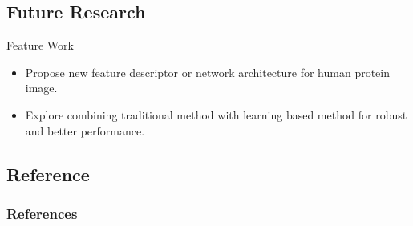 \documentclass[unknownkeysallowed]{beamer}
\begin{document}
	\subsection{Future Research}
	\begin{frame}
		\begin{block}{Feature Work}
		\begin{itemize}
			\item Propose new feature descriptor or network architecture for human protein image.
			\item Explore combining traditional method with learning based method for robust and better performance.
		\end{itemize}	
		\end{block}
	\end{frame}
	
	\subsection{Reference}
	\begin{frame}[allowframebreaks]
        \frametitle{References}
        
        
		
	\end{frame}
\end{document}
